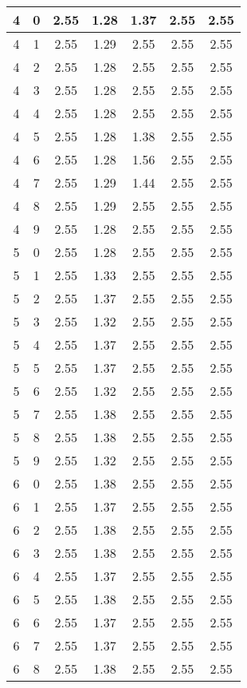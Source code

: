\begin{longtable}{|c|c||c||c|c||c|c|}
	4 & 0 & 2.55 & 1.28 & 1.37 & 2.55 & 2.55 \\ \hline
	4 & 1 & 2.55 & 1.29 & 2.55 & 2.55 & 2.55 \\ \hline
	4 & 2 & 2.55 & 1.28 & 2.55 & 2.55 & 2.55 \\ \hline
	4 & 3 & 2.55 & 1.28 & 2.55 & 2.55 & 2.55 \\ \hline
	4 & 4 & 2.55 & 1.28 & 2.55 & 2.55 & 2.55 \\ \hline
	4 & 5 & 2.55 & 1.28 & 1.38 & 2.55 & 2.55 \\ \hline
	4 & 6 & 2.55 & 1.28 & 1.56 & 2.55 & 2.55 \\ \hline
	4 & 7 & 2.55 & 1.29 & 1.44 & 2.55 & 2.55 \\ \hline
	4 & 8 & 2.55 & 1.29 & 2.55 & 2.55 & 2.55 \\ \hline
	4 & 9 & 2.55 & 1.28 & 2.55 & 2.55 & 2.55 \\ \hline
	5 & 0 & 2.55 & 1.28 & 2.55 & 2.55 & 2.55 \\ \hline
	5 & 1 & 2.55 & 1.33 & 2.55 & 2.55 & 2.55 \\ \hline
	5 & 2 & 2.55 & 1.37 & 2.55 & 2.55 & 2.55 \\ \hline
	5 & 3 & 2.55 & 1.32 & 2.55 & 2.55 & 2.55 \\ \hline
	5 & 4 & 2.55 & 1.37 & 2.55 & 2.55 & 2.55 \\ \hline
	5 & 5 & 2.55 & 1.37 & 2.55 & 2.55 & 2.55 \\ \hline
	5 & 6 & 2.55 & 1.32 & 2.55 & 2.55 & 2.55 \\ \hline
	5 & 7 & 2.55 & 1.38 & 2.55 & 2.55 & 2.55 \\ \hline
	5 & 8 & 2.55 & 1.38 & 2.55 & 2.55 & 2.55 \\ \hline
	5 & 9 & 2.55 & 1.32 & 2.55 & 2.55 & 2.55 \\ \hline
	6 & 0 & 2.55 & 1.38 & 2.55 & 2.55 & 2.55 \\ \hline
	6 & 1 & 2.55 & 1.37 & 2.55 & 2.55 & 2.55 \\ \hline
	6 & 2 & 2.55 & 1.38 & 2.55 & 2.55 & 2.55 \\ \hline
	6 & 3 & 2.55 & 1.38 & 2.55 & 2.55 & 2.55 \\ \hline
	6 & 4 & 2.55 & 1.37 & 2.55 & 2.55 & 2.55 \\ \hline
	6 & 5 & 2.55 & 1.38 & 2.55 & 2.55 & 2.55 \\ \hline
	6 & 6 & 2.55 & 1.37 & 2.55 & 2.55 & 2.55 \\ \hline
	6 & 7 & 2.55 & 1.37 & 2.55 & 2.55 & 2.55 \\ \hline
	6 & 8 & 2.55 & 1.38 & 2.55 & 2.55 & 2.55 \\ \hline

\end{longtable}
